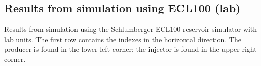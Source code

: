 {\tiny
\vspace{.5cm}
\hspace{-1cm}
}

\subsection{Results from simulation using ECL100 (lab)} %
\label{sub:results_from_simulation_using_ecl100_lab}
Results from simulation using the Schlumberger ECL100 reservoir simulator with lab units. The first row contains the indexes in the horizontal direction. The producer is found in the lower-left corner; the injector is found in the upper-right corner.

{\tiny
\vspace{.5cm}
\hspace{-1cm}
}

